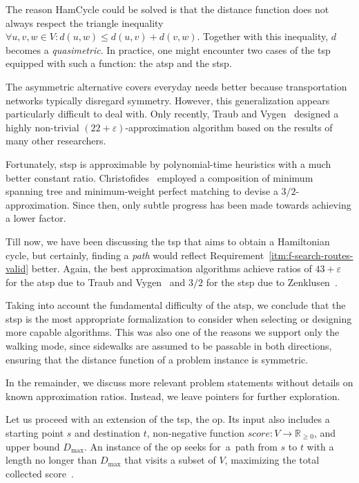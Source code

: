 The reason HamCycle could be solved is that the distance function does not always respect the triangle inequality $\forall u, v, w \in V : d(u, w) \leq d(u, v) + d(v, w)$. To\-geth\-er with this inequality, $d$ becomes a \emph{quasimetric}. In practice, one might en\-counter two cases of the \acs{tsp} equipped with such a function: the \ac{atsp} and the \ac{stsp}.

The asymmetric alternative covers everyday needs better because transportation networks typically disregard symmetry. However, this generalization appears particularly difficult to deal with. Only recently, Traub and Vygen~\cite{traub20} designed a highly non-trivial $(22+\varepsilon)$-approximation algorithm based on the results of many other researchers.

Fortunately, \acs{stsp} is approximable by polynomial-time heuristics with a much better constant ratio. Christofides~\cite{christofides76} employed a composition of minimum spanning tree and minimum-weight perfect matching to devise a $3/2$-approximation. Since then, only subtle progress has been made towards achieving a lower factor.

Till now, we have been discussing the \acs{tsp} that aims to obtain a Hamiltonian cycle, but certainly, finding a \emph{path} would reflect Requirement~\ref{itm:f-search-routes-valid} better. Again, the best approximation algorithms achieve ratios of $43 + \varepsilon$ for the \acs{atsp} due to Traub and Vygen~\cite{traub20} and $3/2$ for the \acs{stsp} due to Zenklusen~\cite{zenklusen18}.

Taking into account the fundamental difficulty of the \acs{atsp}, we conclude that the \acs{stsp} is the most appropriate formalization to consider when selecting or de\-sign\-ing more capable algorithms. This was also one of the reasons we support only the walking mode, since sidewalks are assumed to be passable in both directions, ensuring that the distance function of a problem instance is symmetric.

In the remainder, we discuss more relevant problem statements without details on known approximation ratios. Instead, we leave pointers for further exploration.

\vspace{0.5em}

Let us proceed with an extension of the \acs{tsp}, the \ac{op}. Its input also includes a starting point $s$ and destination $t$, non-negative function $score: V \to \mathbb{R}_{\geq 0}$, and upper bound $D_{\text{max}}$. An instance of the \acs{op} seeks for~a~path from $s$ to $t$ with a length no longer than $D_{\text{max}}$ that visits a subset of $V$, maximizing the total collected score~\cite{gunawan16}.

